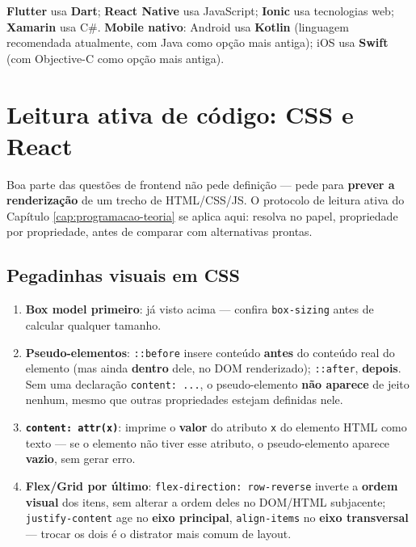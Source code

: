 \begin{conceito}
\textbf{Flutter} usa \textbf{Dart}; \textbf{React Native} usa
JavaScript; \textbf{Ionic} usa tecnologias web; \textbf{Xamarin} usa C\#.
\textbf{Mobile nativo}: Android usa \textbf{Kotlin} (linguagem
recomendada atualmente, com Java como opção mais antiga); iOS usa
\textbf{Swift} (com Objective-C como opção mais antiga).
\end{conceito}

\section{Leitura ativa de código: CSS e React}
\label{sec:leitura-ativa-frontend-teoria}

Boa parte das questões de frontend não pede definição --- pede para
\textbf{prever a renderização} de um trecho de HTML/CSS/JS. O protocolo
de leitura ativa do Capítulo \ref{cap:programacao-teoria} se aplica aqui:
resolva no papel, propriedade por propriedade, antes de comparar com
alternativas prontas.

\subsection{Pegadinhas visuais em CSS}

\begin{conceito}
\begin{enumerate}
\item \textbf{Box model primeiro}: já visto acima --- confira
\texttt{box-sizing} antes de calcular qualquer tamanho.
\item \textbf{Pseudo-elementos}: \texttt{::before} insere conteúdo
\textbf{antes} do conteúdo real do elemento (mas ainda \textbf{dentro}
dele, no DOM renderizado); \texttt{::after}, \textbf{depois}. Sem uma
declaração \texttt{content: ...}, o pseudo-elemento \textbf{não aparece}
de jeito nenhum, mesmo que outras propriedades estejam definidas nele.
\item \textbf{\texttt{content: attr(x)}}: imprime o \textbf{valor} do
atributo \texttt{x} do elemento HTML como texto --- se o elemento não
tiver esse atributo, o pseudo-elemento aparece \textbf{vazio}, sem gerar
erro.
\item \textbf{Flex/Grid por último}: \texttt{flex-direction:
row-reverse} inverte a \textbf{ordem visual} dos itens, sem alterar a
ordem deles no DOM/HTML subjacente; \texttt{justify-content} age no
\textbf{eixo principal}, \texttt{align-items} no \textbf{eixo
transversal} --- trocar os dois é o distrator mais comum de layout.
\end{enumerate}
\end{conceito}


